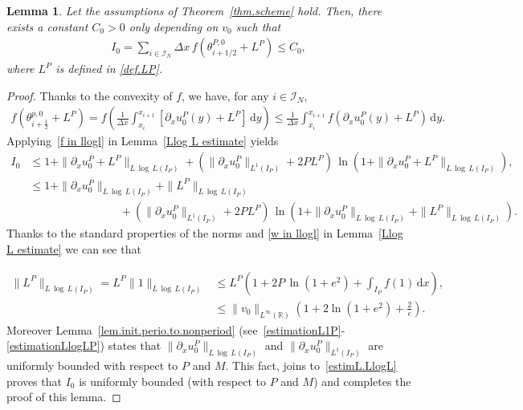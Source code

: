 \documentclass[11pt]{amsart}
\newtheorem{lemma}{Lemma}
\newcommand{\dd}{\mathrm{d}}
\newcommand{\pa}{\partial}
\newcommand{\R}{\mathbb{R}}
\newcommand{\I}{\mathcal{I}_N}
\begin{document}
\begin{lemma}\label{lem.boundinitent}
Let the assumptions of Theorem~\ref{thm.scheme} hold. Then, there exists a constant $C_0>0$ 
only depending on $v_0$ 
 such that
\begin{align*}
    I_0=\sum_{i\in\I} \Delta x \, f\left(\theta^{P,0}_{i+1/2}+L^P\right) \leq C_0, 
\end{align*}
where $L^P$ is defined in \eqref{def.LP}. 

\end{lemma}

\begin{proof}
Thanks to the convexity of $f$, we have, for any $i \in \I$,
\begin{align*}
f\left(\theta_{i+\frac{1}{2}} ^{p, 0} + L^P\right) =  f\left(\frac{1}{\Delta x}\int_{x_i} ^{x_{i+1}}\left[\partial_x u_0^P (y)+ L^P\right] \, \dd y\right)\leq \frac{1}{\Delta x}\int_{x_i} ^{x_{i+1}} f\left(\partial_x u_0^P (y) + L^P\right) \, \dd y.
\end{align*}
Applying~\eqref{f in llogl} in Lemma~\ref{Llog L estimate} yields
\begin{align*}
I_0 &\leq 1 + \|\pa_x u^P_0+ L^P\|_{L\,\log\,L(I_P)} + \left(\|\pa_x u^P_0\|_{L^1(I_P)} + 2PL^P\right) \, \ln\left(1+\|\pa_x u^P_0+L^P\|_{L\,\log\,L(I_P)}\right), \\
&\leq 1 + \|\pa_x u^P_0\|_{L\,\log\,L(I_P)}+ \|L^P\|_{L\,\log\,L(I_P)} \\
&\phantom{xxxxxxxxxxxxxx}+ \left(\|\pa_x u^P_0\|_{L^1(I_P)} + 2PL^P\right) \, \ln\left(1+\|\pa_x u^P_0\|_{L\,\log\,L(I_P)}+\|L^P\|_{L\,\log\,L(I_P)}\right).     
\end{align*}
Thanks to the standard properties of the norms and \eqref{w in llogl} in Lemma~\ref{Llog L estimate} we can see that 

\begin{equation}\label{estimL.LlogL}\begin{array}{ll}
\|L^P\|_{L\,\log\,L(I_P)}=L^P\|1\|_{L\,\log\,L(I_P)}  &
\displaystyle\leq L^P\left(1+ 2P \, \ln(1+e^2) + \int_{I_P} f(1)\, \dd x\right), 
\\ &
\displaystyle \leq \|v_0\|_{L^\infty(\R)}\left(1+2\ln(1+e^2)+\frac{2}{e}\right). 
\end{array}\end{equation}
Moreover Lemma~\ref{lem.init.perio.to.nonperiod} (see~\eqref{estimationL1P}-\eqref{estimationLlogLP}) states that 
$\|\pa_x u^P_0\|_{L\,\log\,L(I_P)}$ and $\|\pa_x u^P_0\|_{L^1(I_P)}$ are uniformly bounded with respect to $P$ and $M$. This fact, joins to~\eqref{estimL.LlogL}  
proves that $I_0$ is  uniformly bounded (with respect to $P$ and $M$) and completes the proof of this lemma. 
\end{proof}
\end{document}
